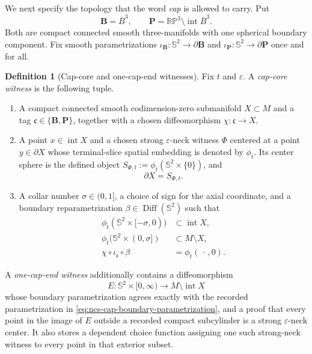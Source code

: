 \documentclass[10pt]{coll-l}
\newcommand{\Sph}{\mathbb{S}}
\theoremstyle{definition}
\newtheorem{definition}[theorem]{Definition}
\theoremstyle{remark}
\numberwithin{section}{chapter}
\numberwithin{equation}{chapter}
\begin{document}
We next specify the topology that the word \emph{cap} is allowed to carry.
Put
\begin{equation}
 \mathbf B=\overline B^3,\qquad
 \mathbf P=\mathbb{RP}^3\setminus\operatorname{int}\overline B^3.
                                                        \label{eq:ncs-cap-models}
\end{equation}
Both are compact connected smooth three-manifolds with one spherical
boundary component.  Fix smooth parametrizations
$\iota_{\mathbf B}:\Sph^2\to\partial\mathbf B$ and
$\iota_{\mathbf P}:\Sph^2\to\partial\mathbf P$ once and for all.

\begin{definition}[Cap-core and one-cap-end witnesses]
\label{def:ncs-cap-witness}
Fix $t$ and $\varepsilon$.  A \emph{cap-core witness} is the following
tuple.
\begin{enumerate}
\item A compact connected smooth codimension-zero submanifold
      $X\subset M$ and a tag $\mathfrak c\in\{\mathbf B,\mathbf P\}$,
      together with a chosen diffeomorphism $\chi:\mathfrak c\to X$.
\item A point $x\in\operatorname{int}X$ and a chosen strong
      $\varepsilon$-neck witness $\Phi$ centered at a point $y\in\partial X$
      whose terminal-slice spatial embedding is denoted by $\phi_t$.  Its
      center sphere is the defined object
      $S_{\Phi,t}:=\phi_t(\Sph^2\times\{0\})$, and
      \begin{equation}
                     \partial X=S_{\Phi,t}.             \label{eq:ncs-cap-boundary-sphere}
      \end{equation}
\item A collar number $\sigma\in(0,1]$, a choice of sign for the axial
      coordinate, and a boundary reparametrization
      $\beta\in\operatorname{Diff}(\Sph^2)$ such that
      \begin{align}
       \phi_t(\Sph^2\times[-\sigma,0))
                    &\subset\operatorname{int}X,       \label{eq:ncs-cap-inner-collar}\\
       \phi_t(\Sph^2\times(0,\sigma])
                    &\subset M\setminus X,             \label{eq:ncs-cap-outer-collar}\\
       \chi\circ\iota_{\mathfrak c}\circ\beta
                    &=\phi_t(\,\cdot\,,0).            \label{eq:ncs-cap-boundary-parametrization}
      \end{align}
\end{enumerate}
A \emph{one-cap-end witness} additionally contains a diffeomorphism
\begin{equation}
 E:\Sph^2\times[0,\infty)\longrightarrow
                M\setminus\operatorname{int}X              \label{eq:ncs-one-cap-end-map}
\end{equation}
whose boundary parametrization agrees exactly with the recorded
parametrization in \eqref{eq:ncs-cap-boundary-parametrization}, and a proof
that every point in the image of $E$ outside a recorded compact
subcylinder is a strong $\varepsilon$-neck center.  It also stores a
dependent choice function assigning one such strong-neck witness to every
point in that exterior subset.


\end{definition}
\end{document}
